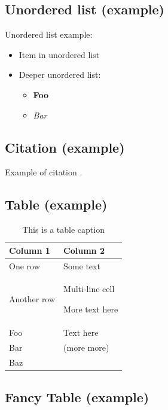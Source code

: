 \subsection{Unordered list (example)}

Unordered list example:
\begin{itemize}
\item Item in unordered list
\item Deeper unordered list:
  \begin{itemize}
  \item \textbf{Foo}
  \item \textit{Bar}
  \end{itemize}
\end{itemize}

\subsection{Citation (example)}

Example of citation \cite{urlSource}.

\newpage
\subsection{Table (example)}


\begin{table}[!h]
  \caption{This is a table caption}
  \centering
  \begin{tabular}{|L{5.1cm}|L{9.1cm}|}
    \hline
    \textbf{Column 1} & \textbf{Column 2}\\ \hline
    One row     & Some text\\ \hline
    Another row & Multi-line cell

                  More text here\\ \hline

    Foo & Text here\\ \hhline{-~}
    Bar & (more more)\\ \hhline{-~}
    Baz & \\ \hline
  \end{tabular}
\end{table}

\newpage
\subsection{Fancy Table (example)}


